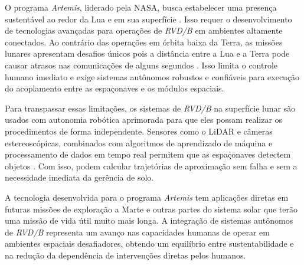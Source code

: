 O programa \emph{Artemis}, liderado pela NASA, busca estabelecer uma presença sustentável ao redor da Lua e em sua superfície \cite{nasaArtemis}.
Isso requer o desenvolvimento de tecnologias avançadas para operações de \emph{RVD/B} em ambientes altamente conectados.
Ao contrário das operações em órbita baixa da Terra, as missões lunares apresentam desafios únicos pois a distância entre a Lua e a Terra pode causar atrasos nas comunicações de alguns segundos \cite{keeports2006}.
Isso limita o controle humano imediato e exige sistemas autônomos robustos e confiáveis para execução do acoplamento entre as espaçonaves e os módulos espaciais.

Para transpassar essas limitações, os sistemas de \emph{RVD/B} na superfície lunar são usados com autonomia robótica aprimorada para que eles possam realizar os procedimentos de forma independente.
Sensores como o LiDAR \cite{farkasvolgyi2023} e câmeras estereoscópicas, combinados com algoritmos de aprendizado de máquina e processamento de dados em tempo real permitem que as espaçonaves detectem objetos \cite{ibmComputerVision}.
Com isso, podem calcular trajetórias de aproximação sem falha e sem a necessidade imediata da gerência de solo.

A tecnologia desenvolvida para o programa \emph{Artemis} tem aplicações diretas em futuras missões de exploração a Marte e outras partes do sistema solar que terão uma missão de vida útil muito mais longa.
A integração de sistemas autônomos de \emph{RVD/B} representa um avanço nas capacidades humanas de operar em ambientes espaciais desafiadores, obtendo um equilíbrio entre sustentabilidade e na redução da dependência de intervenções diretas pelos humanos.